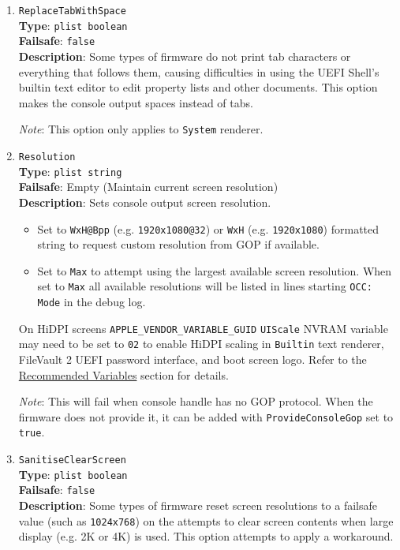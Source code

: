\documentclass[]{article}
\providecommand{\tightlist}{%
  \setlength{\itemsep}{0pt}\setlength{\parskip}{0pt}}
\begin{document}
\begin{enumerate}
\item
  \texttt{ReplaceTabWithSpace}\\
  \textbf{Type}: \texttt{plist\ boolean}\\
  \textbf{Failsafe}: \texttt{false}\\
  \textbf{Description}: Some types of firmware do not print tab characters or everything
  that follows them, causing difficulties in using the UEFI Shell's builtin
  text editor to edit property lists and other documents. This option makes the console
  output spaces instead of tabs.

  \emph{Note}: This option only applies to \texttt{System} renderer.

\item
  \texttt{Resolution}\\
  \textbf{Type}: \texttt{plist\ string}\\
  \textbf{Failsafe}: Empty (Maintain current screen resolution)\\
  \textbf{Description}: Sets console output screen resolution.

  \begin{itemize}
  \tightlist
  \item Set to \texttt{WxH@Bpp} (e.g. \texttt{1920x1080@32}) or \texttt{WxH}
  (e.g. \texttt{1920x1080}) formatted string to request custom resolution
  from GOP if available.
  \item Set to \texttt{Max} to attempt using the largest
  available screen resolution. When set to \texttt{Max} all available resolutions
  will be listed in lines starting \texttt{OCC: Mode} in the debug log.
  \end{itemize}

  On HiDPI screens \texttt{APPLE\_VENDOR\_VARIABLE\_GUID} \texttt{UIScale}
  NVRAM variable may need to be set to \texttt{02} to enable HiDPI scaling
  in \texttt{Builtin} text renderer, FileVault 2 UEFI password interface,
  and boot screen logo. Refer to the \hyperref[nvramvarsrec]{Recommended Variables}
  section for details.

  \emph{Note}: This will fail when console handle has no GOP protocol. When
  the firmware does not provide it, it can be added with \texttt{ProvideConsoleGop}
  set to \texttt{true}.

\item
  \texttt{SanitiseClearScreen}\\
  \textbf{Type}: \texttt{plist\ boolean}\\
  \textbf{Failsafe}: \texttt{false}\\
  \textbf{Description}: Some types of firmware reset screen resolutions to a failsafe
  value (such as \texttt{1024x768}) on the attempts to clear screen contents
  when large display (e.g. 2K or 4K) is used. This option attempts to apply
  a workaround.


\end{enumerate}
\end{document}
